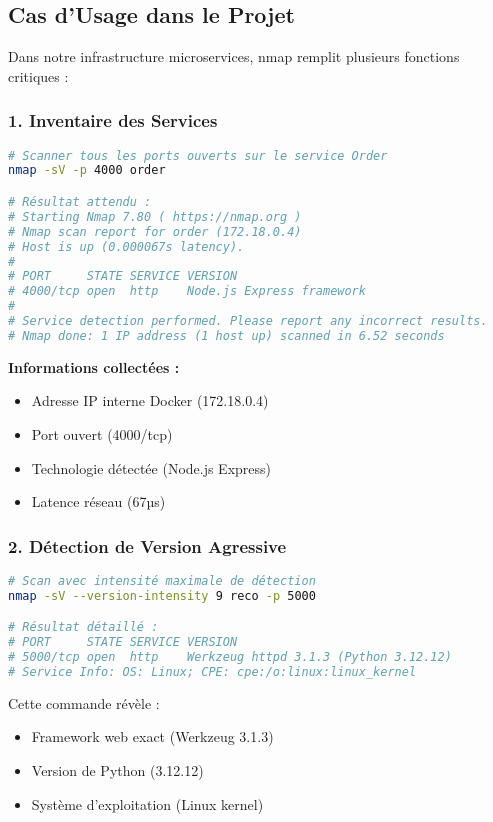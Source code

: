 \documentclass[11pt,a4paper]{report}
\begin{document}
\subsection{Cas d'Usage dans le Projet}

Dans notre infrastructure microservices, nmap remplit plusieurs fonctions critiques :

\subsubsection{1. Inventaire des Services}

\begin{lstlisting}[language=bash, caption=Scan de Base des Services]
# Scanner tous les ports ouverts sur le service Order
nmap -sV -p 4000 order

# Résultat attendu :
# Starting Nmap 7.80 ( https://nmap.org )
# Nmap scan report for order (172.18.0.4)
# Host is up (0.000067s latency).
# 
# PORT     STATE SERVICE VERSION
# 4000/tcp open  http    Node.js Express framework
# 
# Service detection performed. Please report any incorrect results.
# Nmap done: 1 IP address (1 host up) scanned in 6.52 seconds
\end{lstlisting}

\textbf{Informations collectées :}
\begin{itemize}
    \item Adresse IP interne Docker (172.18.0.4)
    \item Port ouvert (4000/tcp)
    \item Technologie détectée (Node.js Express)
    \item Latence réseau (67µs)
\end{itemize}

\subsubsection{2. Détection de Version Agressive}

\begin{lstlisting}[language=bash, caption=Détection Détaillée des Versions]
# Scan avec intensité maximale de détection
nmap -sV --version-intensity 9 reco -p 5000

# Résultat détaillé :
# PORT     STATE SERVICE VERSION
# 5000/tcp open  http    Werkzeug httpd 3.1.3 (Python 3.12.12)
# Service Info: OS: Linux; CPE: cpe:/o:linux:linux_kernel
\end{lstlisting}

Cette commande révèle :
\begin{itemize}
    \item Framework web exact (Werkzeug 3.1.3)
    \item Version de Python (3.12.12)
    \item Système d'exploitation (Linux kernel)
\end{itemize}
\end{document}
